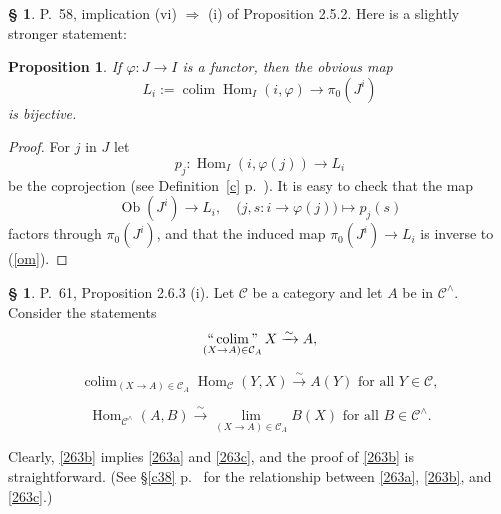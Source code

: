 \documentclass[12pt]{article}%
\newtheorem{prop}[thm]{Proposition}
\theoremstyle{remark}
\theoremstyle{definition}
\newtheorem{s}[thm]{\S}%
\newcommand{\C}{\mathcal C}
\newcommand{\pp}{\varphi}
\newcommand{\then}{\Rightarrow}
\DeclareMathOperator*{\colim}{colim}%
\DeclareMathOperator*{\ic}{``\colim"}
\DeclareMathOperator{\Hom}{Hom}%
\DeclareMathOperator{\Ob}{Ob}
\begin{document}
\begin{s} 
P.~58, implication (vi) $\then$ (i) of Proposition 2.5.2. Here is a slightly stronger statement:
%
\begin{prop} 
If $\pp:J\to I$ is a functor, then the obvious map
\begin{equation}\label{om}
L_i:=\colim\Hom_I(i,\pp)\to\pi_0(J^i)
\end{equation}
is bijective. 
\end{prop}
% 
\begin{proof}
For $j$ in $J$ let 
$$
p_j:\Hom_I(i,\pp(j))\to L_i
$$
be the coprojection (see Definition~\ref{c} p.~\pageref{c}). It is easy to check that the map 
$$
\Ob(J^i)\to L_i,\quad\big(j,s:i\to\pp(j)\big)\mapsto p_j(s)
$$
factors through $\pi_0(J^i)$, and that the induced map $\pi_0(J^i)\to L_i$ is inverse to (\ref{om}).
\end{proof}
\end{s}

%

\begin{s}
P.~61, Proposition 2.6.3 (i). Let $\C$ be a category and let $A$ be in $\C^\wedge$. Consider the statements
%
\begin{equation}\label{263a}
\ic_{(X\to A)\in\C_A}X\xrightarrow\sim A,
\end{equation} 

\begin{equation}\label{263b}
\colim_{(X\to A)\in\C_A}\Hom_\C(Y,X)\xrightarrow\sim A(Y)\text{ for all }Y\in\C, 
\end{equation}

\begin{equation}\label{263c}
\Hom_{\C^\wedge}(A,B)\xrightarrow\sim\lim_{(X\to A)\in\C_A}B(X)\text{ for all }B\in\C^\wedge. 
\end{equation}

Clearly, \eqref{263b} implies \eqref{263a} and \eqref{263c}, and the proof of \eqref{263b} is straightforward. (See \S\ref{c38} p.~\pageref{c38} for the relationship between \eqref{263a}, \eqref{263b}, and \eqref{263c}.)
\end{s}

%
\end{document}
